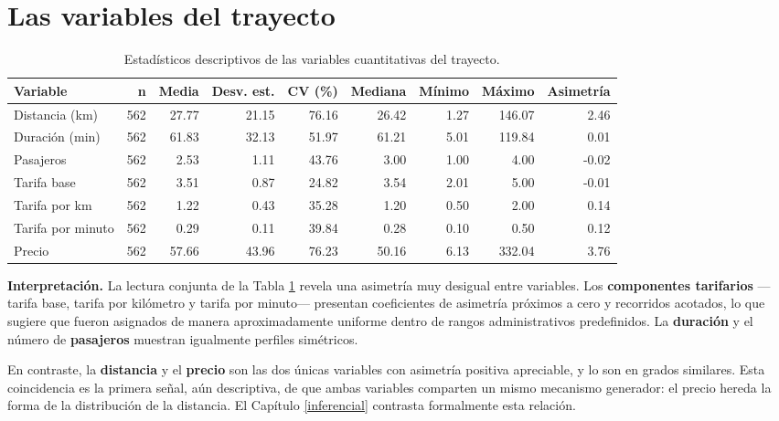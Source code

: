 \documentclass[
]{book}
\begin{document}
\section{Las variables del trayecto}\label{las-variables-del-trayecto}

\begin{table}

\caption{\label{tab:desc-numericas}Estadísticos descriptivos de las variables cuantitativas del trayecto.}
\centering
\begin{tabular}[t]{l|r|r|r|r|r|r|r|r}
\hline
Variable & n & Media & Desv. est. & CV (\%) & Mediana & Mínimo & Máximo & Asimetría\\
\hline
Distancia (km) & 562 & 27.77 & 21.15 & 76.16 & 26.42 & 1.27 & 146.07 & 2.46\\
\hline
Duración (min) & 562 & 61.83 & 32.13 & 51.97 & 61.21 & 5.01 & 119.84 & 0.01\\
\hline
Pasajeros & 562 & 2.53 & 1.11 & 43.76 & 3.00 & 1.00 & 4.00 & -0.02\\
\hline
Tarifa base & 562 & 3.51 & 0.87 & 24.82 & 3.54 & 2.01 & 5.00 & -0.01\\
\hline
Tarifa por km & 562 & 1.22 & 0.43 & 35.28 & 1.20 & 0.50 & 2.00 & 0.14\\
\hline
Tarifa por minuto & 562 & 0.29 & 0.11 & 39.84 & 0.28 & 0.10 & 0.50 & 0.12\\
\hline
Precio & 562 & 57.66 & 43.96 & 76.23 & 50.16 & 6.13 & 332.04 & 3.76\\
\hline
\end{tabular}
\end{table}

\textbf{Interpretación.} La lectura conjunta de la Tabla \ref{tab:desc-numericas} revela una
asimetría muy desigual entre variables. Los \textbf{componentes tarifarios} ---tarifa base, tarifa
por kilómetro y tarifa por minuto--- presentan coeficientes de asimetría próximos a cero y
recorridos acotados, lo que sugiere que fueron asignados de manera aproximadamente uniforme
dentro de rangos administrativos predefinidos. La \textbf{duración} y el número de \textbf{pasajeros}
muestran igualmente perfiles simétricos.

En contraste, la \textbf{distancia} y el \textbf{precio} son las dos únicas variables con asimetría
positiva apreciable, y lo son en grados similares. Esta coincidencia es la primera señal, aún
descriptiva, de que ambas variables comparten un mismo mecanismo generador: el precio hereda
la forma de la distribución de la distancia. El Capítulo \ref{inferencial} contrasta
formalmente esta relación.
\end{document}
